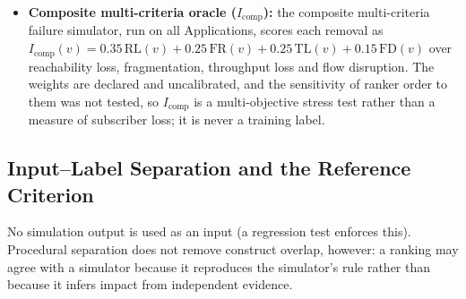 \begin{itemize}
    \item \textbf{Composite multi-criteria oracle ($I_{\text{comp}}$):} the composite multi-criteria failure simulator, run on all Applications, scores each removal as $I_{\text{comp}}(v) = 0.35\,\text{RL}(v) + 0.25\,\text{FR}(v) + 0.25\,\text{TL}(v) + 0.15\,\text{FD}(v)$ over reachability loss, fragmentation, throughput loss and flow disruption. The weights are declared and uncalibrated, and the sensitivity of ranker order to them was not tested, so $I_{\text{comp}}$ is a multi-objective stress test rather than a measure of subscriber loss; it is never a training label.
\end{itemize}

\subsection{Input--Label Separation and the Reference Criterion}
\label{sec:4.4}

No simulation output is used as an input (a regression test enforces this). Procedural separation does not remove construct overlap, however: a ranking may agree with a simulator because it reproduces the simulator's rule rather than because it infers impact from independent evidence.


